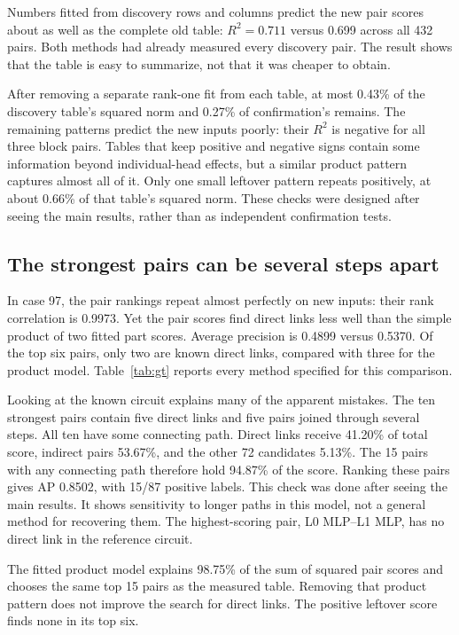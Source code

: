 \documentclass[11pt,letterpaper]{article}
\begin{document}
Numbers fitted from discovery rows and columns predict the new pair scores
about as well as the complete old table: $R^2=0.711$ versus 0.699 across all
432 pairs. Both methods had already measured every discovery pair. The result
shows that the table is easy to summarize, not that it was cheaper to obtain.

After removing a separate rank-one fit from each table, at most 0.43\% of the
discovery table's squared norm and 0.27\% of confirmation's remains. The
remaining patterns predict the new inputs poorly: their $R^2$ is negative for
all three block pairs. Tables that keep positive and negative signs contain
some information beyond individual-head effects, but a similar product pattern
captures almost all of it. Only one small leftover pattern repeats positively,
at about 0.66\% of that table's squared norm. These checks were designed after
seeing the main results, rather than as independent confirmation tests.

\subsection*{The strongest pairs can be several steps apart}
In case 97, the pair rankings repeat almost perfectly on new inputs: their
rank correlation is 0.9973. Yet the pair scores find direct links less well
than the simple product of two fitted part scores. Average precision is
0.4899 versus 0.5370. Of the top six pairs, only two are known direct links,
compared with three for the product model. Table~\ref{tab:gt} reports every
method specified for this comparison.





Looking at the known circuit explains many of the apparent mistakes. The ten
strongest pairs contain five direct links and five pairs joined through
several steps. All ten have some connecting path. Direct links receive 41.20\%
of total score, indirect pairs 53.67\%, and the other 72 candidates 5.13\%.
The 15 pairs with any connecting path therefore hold 94.87\% of the score.
Ranking these pairs gives AP 0.8502, with 15/87 positive labels. This check
was done after seeing the main results. It shows sensitivity to longer paths
in this model, not a general method for recovering them. The highest-scoring
pair, L0 MLP--L1 MLP, has no direct link in the reference circuit.

The fitted product model explains 98.75\% of the sum of squared pair scores
and chooses the same top 15 pairs as the measured table. Removing that product
pattern does not improve the search for direct links. The positive leftover
score finds none in its top six.
\end{document}
